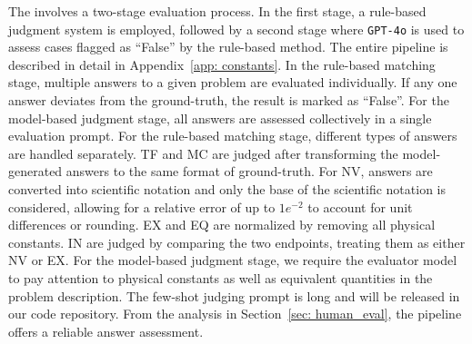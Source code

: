 The {\judge} involves a two-stage evaluation process. 
In the first stage, a rule-based judgment system is employed, followed by a second stage where \texttt{GPT-4o} is used to assess cases flagged as ``False'' by the rule-based method.
The entire pipeline is described in detail in Appendix~\ref{app: constants}. 
In the rule-based matching stage, multiple answers to a given problem are evaluated individually. If any one answer deviates from the ground-truth, the result is marked as ``False''. 
For the model-based judgment stage, all answers are assessed collectively in a single evaluation prompt.
For the rule-based matching stage, different types of answers are handled separately.
TF and MC are judged after transforming the model-generated answers to the same format of ground-truth.
For NV, answers are converted into scientific notation and only the base of the scientific notation is considered, allowing for a relative error of up to $1e^{-2}$ to account for unit differences or rounding.
EX and EQ are normalized by removing all physical constants.
IN are judged by comparing the two endpoints, treating them as either NV or EX.
For the model-based judgment stage, we require the evaluator model to pay attention to physical constants as well as equivalent quantities in the problem description.
The few-shot judging prompt is long and will be released in our code repository.
From the analysis in Section~\ref{sec: human_eval},
the {\judge} pipeline offers a reliable answer assessment.








 

 

 
